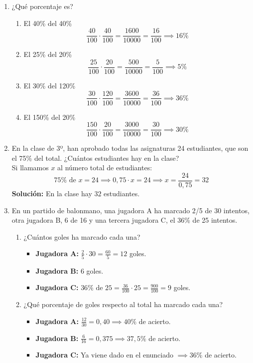 \documentclass[a4paper,12pt]{article}
\begin{document}
\begin{enumerate}
    \item ¿Qué porcentaje es? 
        \begin{enumerate}
            \item El 40\% del 40\% 
                \[
                \frac{40}{100} \cdot \frac{40}{100} = \frac{1600}{10000} = \frac{16}{100} \implies 16\%
                \]
            \item El 25\% del 20\% 
                \[
                \frac{25}{100} \cdot \frac{20}{100} = \frac{500}{10000} = \frac{5}{100} \implies 5\%
                \]
            \item El 30\% del 120\% 
                \[
                \frac{30}{100} \cdot \frac{120}{100} = \frac{3600}{10000} = \frac{36}{100} \implies 36\%
                \]
            \item El 150\% del 20\%
                \[
                \frac{150}{100} \cdot \frac{20}{100} = \frac{3000}{10000} = \frac{30}{100} \implies 30\%
                \] 
        \end{enumerate}
    \item En la clase de 3º, han aprobado todas las asignaturas 24 estudiantes, que son el 75\% del total. ¿Cuántos estudiantes hay en la clase? \\
        Si llamamos $x$ al número total de estudiantes:
        \[
        75\% \text{ de } x = 24 \implies 0{,}75 \cdot x = 24 \implies x = \frac{24}{0{,}75} = 32
        \]
        \textbf{Solución:} En la clase hay $32$ estudiantes.

        
    \item En un partido de balonmano, una jugadora A ha marcado 2/5  de 30 intentos, otra jugadora B, 6 de 16 y una tercera jugadora C, el 36\% de 25 intentos. 
        \begin{enumerate}
            \item ¿Cuántos goles ha marcado cada una?
                \begin{itemize}
                    \item \textbf{Jugadora A:} $\frac{2}{5} \cdot 30 = \frac{60}{5} = 12$ goles.
                    \item \textbf{Jugadora B:} $6$ goles.
                    \item \textbf{Jugadora C:} $36\% \text{ de } 25 = \frac{36}{100} \cdot 25 = \frac{900}{100} = 9$ goles.
                \end{itemize}
            \item ¿Qué porcentaje de goles respecto al total ha marcado cada una?
                \begin{itemize}
                    \item \textbf{Jugadora A:} $\frac{12}{30} = 0{,}40 \implies 40\%$ de acierto.
                    \item \textbf{Jugadora B:} $\frac{6}{16} = 0{,}375 \implies 37{,}5\%$ de acierto.
                    \item \textbf{Jugadora C:} Ya viene dado en el enunciado $\implies 36\%$ de acierto.
                \end{itemize}
        \end{enumerate}


\end{enumerate}
\end{document}
